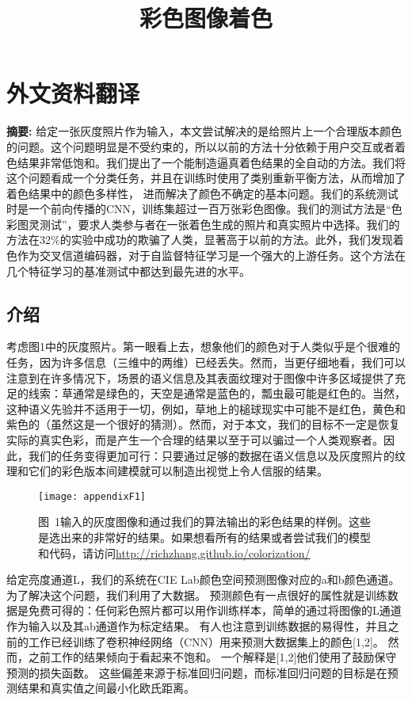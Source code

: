 \chapter{外文资料翻译}
\label{cha:engorg}

\renewcommand\thesection{\arabic {section}}

\title{彩色图像着色}

\textbf{摘要:} 给定一张灰度照片作为输入，本文尝试解决的是给照片上一个合理版本颜色的问题。这个问题明显是不受约束的，所以以前的方法十分依赖于用户交互或者着色结果非常低饱和。我们提出了一个能制造逼真着色结果的全自动的方法。我们将这个问题看成一个分类任务，并且在训练时使用了类别重新平衡方法，从而增加了着色结果中的颜色多样性， 进而解决了颜色不确定的基本问题。我们的系统测试时是一个前向传播的CNN，训练集超过一百万张彩色图像。我们的测试方法是“色彩图灵测试”，要求人类参与者在一张着色生成的照片和真实照片中选择。我们的方法在32\%的实验中成功的欺骗了人类，显著高于以前的方法。此外，我们发现着色作为交叉信道编码器，对于自监督特征学习是一个强大的上游任务。这个方法在几个特征学习的基准测试中都达到最先进的水平。


\section{介绍}
考虑图1中的灰度照片。第一眼看上去，想象他们的颜色对于人类似乎是个很难的任务，因为许多信息（三维中的两维）已经丢失。然而，当更仔细地看，我们可以注意到在许多情况下，场景的语义信息及其表面纹理对于图像中许多区域提供了充足的线索：草通常是绿色的，天空是通常是蓝色的，瓢虫最可能是红色的。当然，这种语义先验并不适用于一切，例如，草地上的槌球现实中可能不是红色，黄色和紫色的（虽然这是一个很好的猜测）。然而，对于本文，我们的目标不一定是恢复实际的真实色彩，而是产生一个合理的结果以至于可以骗过一个人类观察者。因此，我们的任务变得更加可行：只要通过足够的数据在语义信息以及灰度照片的纹理和它们的彩色版本间建模就可以制造出视觉上令人信服的结果。

\begin{figure}[h]
  \centering
  \texttt{[image: appendixF1]}
  \caption*{图~1\quad 输入的灰度图像和通过我们的算法输出的彩色结果的样例。这些是选出来的非常好的结果。如果想看所有的结果或者尝试我们的模型和代码，请访问\url{http://richzhang.github.io/colorization/}}
  \label{tab:badfigure1}
\end{figure}

给定亮度通道L，我们的系统在CIE Lab颜色空间预测图像对应的a和b颜色通道。为了解决这个问题，我们利用了大数据。 预测颜色有一点很好的属性就是训练数据是免费可得的：任何彩色照片都可以用作训练样本，简单的通过将图像的L通道作为输入以及其ab通道作为标定结果。 有人也注意到训练数据的易得性，并且之前的工作已经训练了卷积神经网络（CNN）用来预测大数据集上的颜色[1,2]。 然而，之前工作的结果倾向于看起来不饱和。 一个解释是[1,2]他们使用了鼓励保守预测的损失函数。 这些偏差来源于标准回归问题，而标准回归问题的目标是在预测结果和真实值之间最小化欧氏距离。

